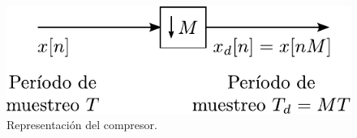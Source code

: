 \documentclass[a4paper]{report}
\begin{document}
\begin{figure}[!htb]
 \begin{minipage}[c]{0.41\textwidth}
  \includegraphics[width=\textwidth]{figuras/sampling_compressor.pdf}
 \end{minipage}\hfill
 \begin{minipage}[c]{0.49\textwidth}
  \caption{
    Representación del compresor.
  }\label{fig:sampling_compressor}
 \end{minipage}
\end{figure}
\end{document}
